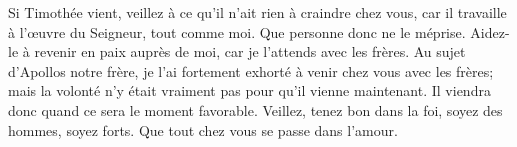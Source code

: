 Si Timothée vient, veillez à ce qu’il n’ait rien à craindre chez vous,
	car il travaille à l’œuvre du Seigneur, tout comme moi.
Que personne donc ne le méprise.
	Aidez-le à revenir en paix auprès de moi, car je l’attends avec les frères.
Au sujet d’Apollos notre frère,
	je l’ai fortement exhorté à venir chez vous avec les frères;
	mais la volonté n’y était vraiment pas pour qu’il vienne maintenant.
	Il viendra donc quand ce sera le moment favorable.
Veillez, tenez bon dans la foi, soyez des hommes, soyez forts.
Que tout chez vous se passe dans l’amour.
